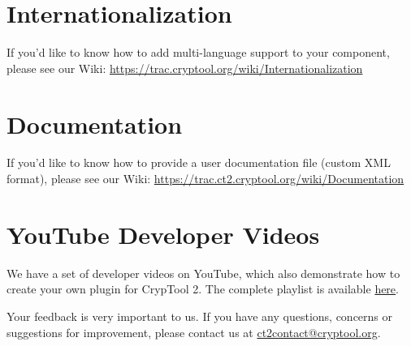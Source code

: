 \chapter{Internationalization}
\label{sec:Internationalization}

If you'd like to know how to add multi-language support to your component, please see our Wiki:
\url{https://trac.cryptool.org/wiki/Internationalization}

\chapter{Documentation}
\label{sec:Documentation}

If you'd like to know how to provide a user documentation file (custom XML format), please see our Wiki:
\url{https://trac.ct2.cryptool.org/wiki/Documentation}

\chapter{YouTube Developer Videos}
\label{sec:YouTubeDeveloperVideos}
We have a set of developer videos on YouTube, which also demonstrate how to create your own plugin for CrypTool 2. The complete playlist is available  \href{https://www.youtube.com/watch?v=YaSd_4t19nk&list=PLMuvAbyIl0PTTfPE2VhJ9PZ6qlOG0MMaX}{here}.

\vskip 2cm

Your feedback is very important to us. If you have any questions, concerns or suggestions for improvement, please contact us at \href{mailto:ct2contact@cryptool.org}{ct2contact@cryptool.org}.